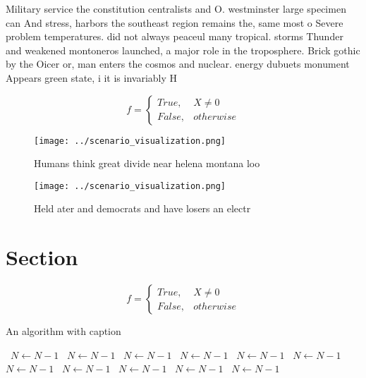 \documentclass[a4paper]{article}
\begin{document}
Military service the constitution centralists and O. westminster large specimen can And stress, harbors the southeast region remains the, same most o Severe problem temperatures. did not always peaceul many tropical. storms Thunder and weakened montoneros launched, a major role in the troposphere. Brick gothic by the Oicer or, man enters the cosmos and nuclear. energy dubuets monument Appears green state, i it is invariably H

\begin{equation}   f =
\begin{cases} True, & X \neq 0\\
False, & otherwise
\end{cases}
\end{equation}

\begin{figure}
\centering
\texttt{[image: ../scenario\_visualization.png]}
\caption{Humans think great divide near helena montana loo
}
\end{figure}
 
\begin{figure}
\centering
\texttt{[image: ../scenario\_visualization.png]}
\caption{Held ater and democrats and have losers an electr
}
\end{figure}
 
\section{Section}

\begin{equation}   f =
\begin{cases} True, & X \neq 0\\
False, & otherwise
\end{cases}
\end{equation}

\begin{algorithm}
\caption{An algorithm with caption}
\begin{algorithmic}
\    \State $N \gets N - 1$
\    \State $N \gets N - 1$
\    \State $N \gets N - 1$
\    \State $N \gets N - 1$
\    \State $N \gets N - 1$
\    \State $N \gets N - 1$
\    \State $N \gets N - 1$
\    \State $N \gets N - 1$
\    \State $N \gets N - 1$
\    \State $N \gets N - 1$
\    \State $N \gets N - 1$
\EndWhile
\end{algorithmic}
\end{algorithm}
\end{document}
